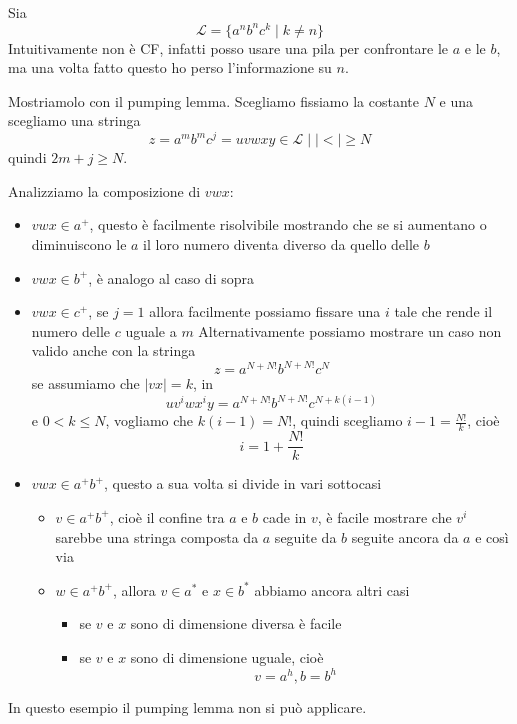 \documentclass[12pt]{report}
\begin{document}
\begin{tcolorbox}[breakable]
Sia
$$ \mathcal{L} = \{ a^n b^n c^k \mid k \neq n \} $$
Intuitivamente non è CF, infatti posso usare una pila per confrontare le $a$ e le $b$, ma una volta fatto questo ho perso l'informazione su $n$.

Mostriamolo con il pumping lemma. 
Scegliamo fissiamo la costante $N$ e una scegliamo una stringa
$$ z = a^m b^m c^j = u v w x y  \in \mathcal{L} \mid |<| \geq N $$
quindi $2m + j \geq N$.

Analizziamo la composizione di $vwx$:
\begin{itemize}
	\item $vwx \in a^+$, questo è facilmente risolvibile mostrando che se si aumentano o diminuiscono le $a$ il loro numero diventa diverso da quello delle $b$
	\item $vwx \in b^+$, è analogo al caso di sopra
	\item $vwx \in c^+$, se $j = 1$ allora facilmente possiamo fissare una $i$ tale che rende il numero delle $c$ uguale a $m$
		Alternativamente possiamo mostrare un caso non valido anche con la stringa 
		$$ z = a^{N + N!} b^{N + N!} c^N $$
		se assumiamo che $|vx| = k$, in
		$$ u v^i w x^i y = a^{N + N!} b^{N + N!} c^{N + k(i - 1)} $$
		e $0 < k \leq N$, vogliamo che $k(i - 1) = N!$, quindi scegliamo $i - 1 = \frac{N!}{k}$, cioè
		$$ i = 1 + \frac{N!}{k} $$
	\item $vwx \in a^+b^+$, questo a sua volta si divide in vari sottocasi
		\begin{itemize}
			\item $v \in a^+ b^+$, cioè il confine tra $a$ e $b$ cade in $v$, è facile mostrare che $v^i$ sarebbe una stringa composta da $a$ seguite da $b$ seguite ancora da $a$ e così via
			\item $w \in a^+ b^+$, allora $v \in a^*$ e $x \in b^*$ abbiamo ancora altri casi
				\begin{itemize}
					\item se $v$ e $x$ sono di dimensione diversa è facile
					\item se $v$ e $x$ sono di dimensione uguale, cioè
						$$ v = a^h, b = b^h $$
				\end{itemize}
		\end{itemize}
\end{itemize}
In questo esempio il pumping lemma non si può applicare. %

\end{tcolorbox}
\end{document}
